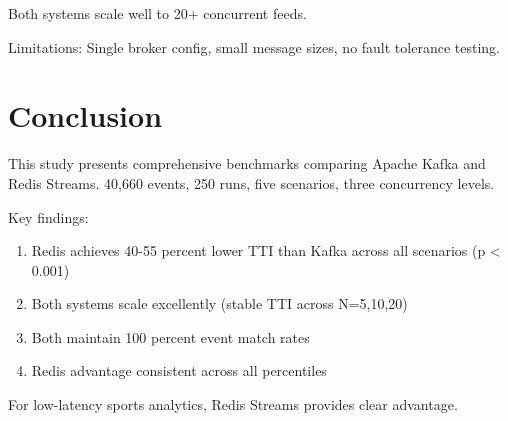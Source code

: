 \documentclass[10pt,a4paper]{article}
\begin{document}
Both systems scale well to 20+ concurrent feeds.

Limitations: Single broker config, small message sizes, no fault tolerance testing.

\section{Conclusion}
\label{sec:conclusion}
This study presents comprehensive benchmarks comparing Apache Kafka and Redis Streams. 40,660 events, 250 runs, five scenarios, three concurrency levels.

Key findings:
\begin{enumerate}
\item Redis achieves 40-55 percent lower TTI than Kafka across all scenarios (p < 0.001)
\item Both systems scale excellently (stable TTI across N=5,10,20)
\item Both maintain 100 percent event match rates
\item Redis advantage consistent across all percentiles
\end{enumerate}

For low-latency sports analytics, Redis Streams provides clear advantage.
\end{document}
